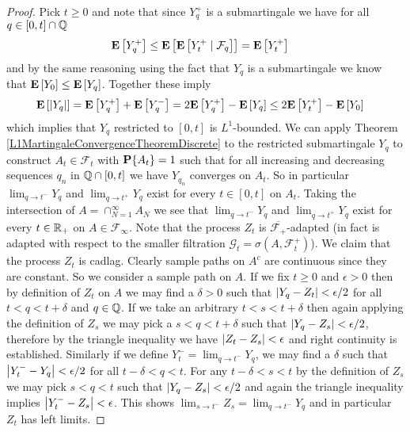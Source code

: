\begin{proof}
Pick $t \geq 0$ and note that since $Y^+_q$ is a submartingale
we have for all $q \in [0,t] \cap \rationals$
\begin{align*}
\expectation{Y^+_q} &\leq
\expectation{\cexpectationlong{\mathcal{F}_q}{Y^+_t}} = \expectation{Y^+_t}
\end{align*}
and by the same reasoning using the fact that $Y_q$ is a submartingale
we know that $\expectation{Y_0} \leq \expectation{Y_q}$.  Together
these imply 
\begin{align*}
\expectation{\abs{Y_q}} &= \expectation{Y^+_q}  + \expectation{Y^-_q}
= 2\expectation{Y^+_q}  - \expectation{Y_q} \leq 2\expectation{Y^+_t}  - \expectation{Y_0} 
\end{align*}
which implies that $Y_q$ restricted to $[0,t]$ is $L^1$-bounded.
We can apply Theorem \ref{L1MartingaleConvergenceTheoremDiscrete} to
the restricted submartingale $Y_q$ to construct $A_t \in \mathcal{F}_t$ with
$\probability{A_t}=1$ such that for all increasing and decreasing
sequences $q_n$ in $\rationals \cap [0,t]$ we have $Y_{q_n}$ converges
on $A_t$.  So in particular $\lim_{q \to t^-} Y_q$ and $\lim_{q
  \to t^+} Y_q$ exist for every $t \in [0,t]$ on $A_t$.  Taking the
intersection of $A = \cap_{N=1}^\infty A_N$ we see that  $\lim_{q \to t^-} Y_q$ and $\lim_{q
  \to t^+} Y_q$ exist for every $t \in \reals_+$ on $A \in
\mathcal{F}_\infty$.  Note that the process $Z_t$ is
$\overline{\mathcal{F}_+}$-adapted (in fact is adapted with respect to
the smaller filtration $\mathcal{G}_t = \sigma(A, \mathcal{F}^+_t)$).
We claim that the process $Z_t$ is cadlag.  Clearly sample paths on
$A^c$ are continuous since they are constant.  So we consider a sample
path on $A$.  If we fix $t \geq 0$ and $\epsilon > 0$ then
by definition of $Z_t$ on $A$ we may find a $\delta > 0$ such that
$\abs{Y_q - Z_t} < \epsilon/2$ for all $t < q < t +\delta$ and $q \in
\rationals$.  If we take an arbitrary $t < s < t + \delta$ then again
applying the definition of $Z_s$ we may pick a $s < q < t+\delta$ such
that $\abs{Y_q - Z_s} < \epsilon/2$, therefore by the triangle
inequality we have $\abs{Z_t - Z_s} < \epsilon$ and right continuity
is established.  Similarly if we define $Y^-_t = \lim_{q \to t^-} Y_q$, we may find a $\delta$ such that
$\abs{Y^-_t - Y_q} < \epsilon/2$ for all $t - \delta < q < t$.  For
any $t - \delta < s < t$ by the definition of $Z_s$ we may pick $s < q
< t$ such that $\abs{Y_q-Z_s} < \epsilon/2$ and again the triangle
inequality implies $\abs{Y^-_t - Z_s} < \epsilon$.
This shows $\lim_{s \to t^-} Z_s = \lim_{q \to t^-} Y_q$
and in particular $Z_t$ has left limits.


\end{proof}
